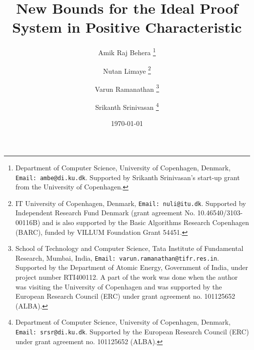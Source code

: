 \documentclass[11pt]{article}
\begin{document}
\title{New Bounds for the Ideal Proof System in Positive Characteristic}
\author{
{Amik Raj Behera \thanks{Department of Computer Science, University of Copenhagen, Denmark, \texttt{Email: ambe@di.ku.dk}. Supported by Srikanth Srinivasan's start-up grant from the University of Copenhagen.}} 
\and 
{Nutan Limaye \thanks{IT University of Copenhagen, Denmark, \texttt{Email: nuli@itu.dk}. Supported by Independent Research Fund Denmark (grant agreement No. 10.46540/3103-00116B) and is also supported by the Basic Algorithms Research Copenhagen (BARC), funded by VILLUM Foundation Grant 54451.}} 
\and 
{Varun Ramanathan \thanks{School of Technology and Computer Science, Tata Institute of Fundamental Research, Mumbai, India, \texttt{Email: varun.ramanathan@tifr.res.in}. Supported by the Department of Atomic Energy, Government of India, under project number RTI400112. A part of the work was done when the author was visiting the University of Copenhagen and was supported by the European Research Council (ERC) under grant agreement no. 101125652 (ALBA).}} 
\and 
{Srikanth Srinivasan \thanks{Department of Computer Science, University of Copenhagen, Denmark, \texttt{Email: srsr@di.ku.dk}. Supported by the European Research Council (ERC) under grant agreement no. 101125652 (ALBA).}}
}
\date{\today}
\maketitle
\end{document}
